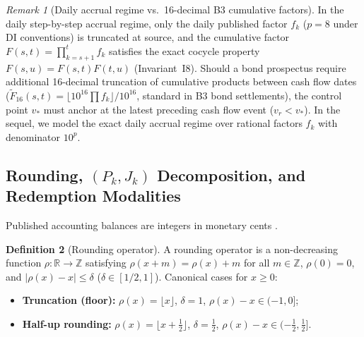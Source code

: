 \documentclass[11pt, a4paper]{article}
\theoremstyle{definition}
\newtheorem{definicao}{Definition}[section]
\theoremstyle{plain}
\theoremstyle{remark}
\newtheorem{observacao}[definicao]{Remark}
\begin{document}
\begin{observacao}[Daily accrual regime vs.\ 16-decimal B3 cumulative factors]\label{obs:5.2}
In the daily step-by-step accrual regime, only the daily published factor $f_k$ ($p=8$ under DI conventions) is truncated at source, and the cumulative factor $F(s,t) = \prod_{k=s+1}^t f_k$ satisfies the exact cocycle property $F(s,u) = F(s,t)F(t,u)$ (Invariant~I8). Should a bond prospectus require additional 16-decimal truncation of cumulative products between cash flow dates ($\tilde{F}_{16}(s,t) = \lfloor 10^{16}\prod f_k\rfloor/10^{16}$, standard in B3 bond settlements), the control point $v_*$ must anchor at the latest preceding cash flow event ($v_r < v_*$). In the sequel, we model the exact daily accrual regime over rational factors $f_k$ with denominator $10^p$.
\end{observacao}

\subsection{Rounding, \texorpdfstring{$(P_k, J_k)$}{(Pk, Jk)} Decomposition, and Redemption Modalities}\label{sec:5.2}

Published accounting balances are integers in monetary cents \cite{Higham2002}.

\begin{definicao}[Rounding operator]\label{def:5.3}
A rounding operator is a non-decreasing function $\rho : \mathbb{R} \to \mathbb{Z}$ satisfying $\rho(x + m) = \rho(x) + m$ for all $m \in \mathbb{Z}$, $\rho(0) = 0$, and $|\rho(x) - x| \le \delta$ ($\delta \in [1/2, 1]$). Canonical cases for $x \ge 0$:
\begin{itemize}
    \item \textbf{Truncation (floor):} $\rho(x) = \lfloor x \rfloor$, $\delta = 1$, $\rho(x) - x \in (-1, 0]$;
    \item \textbf{Half-up rounding:} $\rho(x) = \lfloor x + \frac{1}{2} \rfloor$, $\delta = \frac{1}{2}$, $\rho(x) - x \in (-\frac{1}{2}, \frac{1}{2}]$.
\end{itemize}
\end{definicao}
\end{document}

